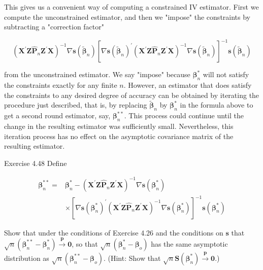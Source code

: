 \documentclass[10pt]{article}
\begin{document}
This gives us a convenient way of computing a constrained IV estimator. First we compute the unconstrained estimator, and then we "impose" the constraints by subtracting a "correction factor"

$$
\left(\mathbf{X}^{\prime} \mathbf{Z} \hat{\mathbf{P}}_{n} \mathbf{Z}^{\prime} \mathbf{X}\right)^{-1} \nabla \mathbf{s}\left(\tilde{\boldsymbol{\beta}}_{n}\right)\left[\nabla \mathbf{s}\left(\tilde{\boldsymbol{\beta}}_{n}\right)^{\prime}\left(\mathbf{X}^{\prime} \mathbf{Z} \hat{\mathbf{P}}_{n} \mathbf{Z}^{\prime} \mathbf{X}\right)^{-1} \nabla \mathbf{s}\left(\tilde{\boldsymbol{\beta}}_{n}\right)\right]^{-1} \mathbf{s}\left(\tilde{\boldsymbol{\beta}}_{n}\right)
$$

from the unconstrained estimator. We say "impose" because $\boldsymbol{\beta}_{n}^{*}$ will not satisfy the constraints exactly for any finite $n$. However, an estimator that does satisfy the constraints to any desired degree of accuracy can be obtained by iterating the procedure just described, that is, by replacing $\tilde{\boldsymbol{\beta}}_{n}$ by $\boldsymbol{\beta}_{n}^{*}$ in the formula above to get a second round estimator, say, $\boldsymbol{\beta}_{n}^{* *}$. This process could continue until the change in the resulting estimator was sufficiently small. Nevertheless, this iteration process has no effect on the asymptotic covariance matrix of the resulting estimator.

Exercise 4.48 Define

$$
\begin{aligned}
\boldsymbol{\beta}_{n}^{* *}= & \boldsymbol{\beta}_{n}^{*}-\left(\mathbf{X}^{\prime} \mathbf{Z} \hat{\mathbf{P}}_{n} \mathbf{Z}^{\prime} \mathbf{X}\right)^{-1} \nabla \mathbf{s}\left(\boldsymbol{\beta}_{n}^{*}\right) \\
& \times\left[\nabla \mathbf{s}\left(\boldsymbol{\beta}_{n}^{*}\right)^{\prime}\left(\mathbf{X}^{\prime} \mathbf{Z} \hat{\mathbf{P}}_{n} \mathbf{Z}^{\prime} \mathbf{X}\right)^{-1} \nabla \mathbf{s}\left(\boldsymbol{\beta}_{n}^{*}\right)\right]^{-1} \mathbf{s}\left(\boldsymbol{\beta}_{n}^{*}\right)
\end{aligned}
$$

Show that under the conditions of Exercise 4.26 and the conditions on $\mathbf{s}$ that $\sqrt{n}\left(\boldsymbol{\beta}_{n}^{* *}-\boldsymbol{\beta}_{n}^{*}\right) \xrightarrow{\boldsymbol{p}} \mathbf{0}$, so that $\sqrt{n}\left(\boldsymbol{\beta}_{n}^{\boldsymbol{*}}-\boldsymbol{\beta}_{o}\right)$ has the same asymptotic distribution as $\sqrt{n}\left(\boldsymbol{\beta}_{n}^{* *}-\boldsymbol{\beta}_{o}\right)$. (Hint: Show that $\sqrt{n} \mathbf{S}\left(\boldsymbol{\beta}_{n}^{*}\right) \xrightarrow{\boldsymbol{p}} \mathbf{0}$.)
\end{document}
